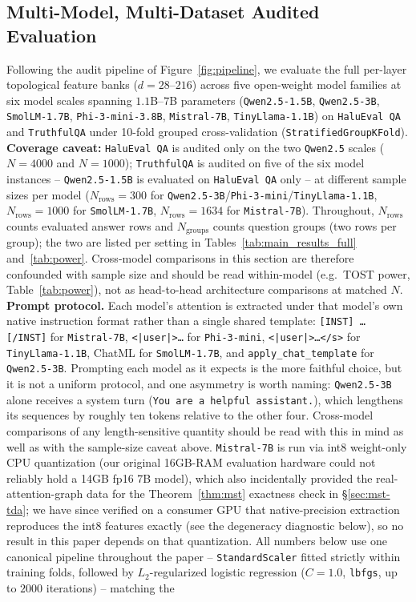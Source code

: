\documentclass{article}
\begin{document}
\subsection{Multi-Model, Multi-Dataset Audited Evaluation}
Following the audit pipeline of Figure~\ref{fig:pipeline}, we evaluate the full per-layer topological feature banks ($d=28$--$216$) across five open-weight model families at six model scales spanning $1.1$B--$7$B parameters (\texttt{Qwen2.5-1.5B}, \texttt{Qwen2.5-3B}, \texttt{SmolLM-1.7B}, \texttt{Phi-3-mini-3.8B}, \texttt{Mistral-7B}, \texttt{TinyLlama-1.1B}) on \texttt{HaluEval QA} \citep{li2024halueval} and \texttt{TruthfulQA} \citep{lin2022truthfulqa} under 10-fold grouped cross-validation (\texttt{StratifiedGroupKFold}). \textbf{Coverage caveat:} \texttt{HaluEval QA} is audited only on the two \texttt{Qwen2.5} scales ($N{=}4000$ and $N{=}1000$); \texttt{TruthfulQA} is audited on five of the six model instances -- \texttt{Qwen2.5-1.5B} is evaluated on \texttt{HaluEval QA} only -- at different sample sizes per model ($N_{\text{rows}}{=}300$ for \texttt{Qwen2.5-3B}/\texttt{Phi-3-mini}/\texttt{TinyLlama-1.1B}, $N_{\text{rows}}{=}1000$ for \texttt{SmolLM-1.7B}, $N_{\text{rows}}{=}1634$ for \texttt{Mistral-7B}). Throughout, $N_{\text{rows}}$ counts evaluated answer rows and $N_{\text{groups}}$ counts question groups (two rows per group); the two are listed per setting in Tables~\ref{tab:main_results_full} and~\ref{tab:power}. Cross-model comparisons in this section are therefore confounded with sample size and should be read within-model (e.g.\ TOST power, Table~\ref{tab:power}), not as head-to-head architecture comparisons at matched $N$. \textbf{Prompt protocol.} Each model's attention is extracted under that model's own native instruction format rather than a single shared template: \texttt{[INST]\,\ldots\,[/INST]} for \texttt{Mistral-7B}, \texttt{<|user|>\ldots<|end|>} for \texttt{Phi-3-mini}, \texttt{<|user|>\ldots</s>} for \texttt{TinyLlama-1.1B}, ChatML for \texttt{SmolLM-1.7B}, and \texttt{apply\_chat\_template} for \texttt{Qwen2.5-3B}. Prompting each model as it expects is the more faithful choice, but it is not a uniform protocol, and one asymmetry is worth naming: \texttt{Qwen2.5-3B} alone receives a system turn (\texttt{You are a helpful assistant.}), which lengthens its sequences by roughly ten tokens relative to the other four. Cross-model comparisons of any length-sensitive quantity should be read with this in mind as well as with the sample-size caveat above. \texttt{Mistral-7B} is run via int8 weight-only CPU quantization (our original 16GB-RAM evaluation hardware could not reliably hold a 14GB fp16 7B model), which also incidentally provided the real-attention-graph data for the Theorem~\ref{thm:mst} exactness check in \S\ref{sec:mst-tda}; we have since verified on a consumer GPU that native-precision extraction reproduces the int8 features exactly (see the degeneracy diagnostic below), so no result in this paper depends on that quantization. All numbers below use one canonical pipeline throughout the paper -- \texttt{StandardScaler} fitted strictly within training folds, followed by $L_2$-regularized logistic regression ($C{=}1.0$, \texttt{lbfgs}, up to $2000$ iterations) -- matching the 
\end{document}
